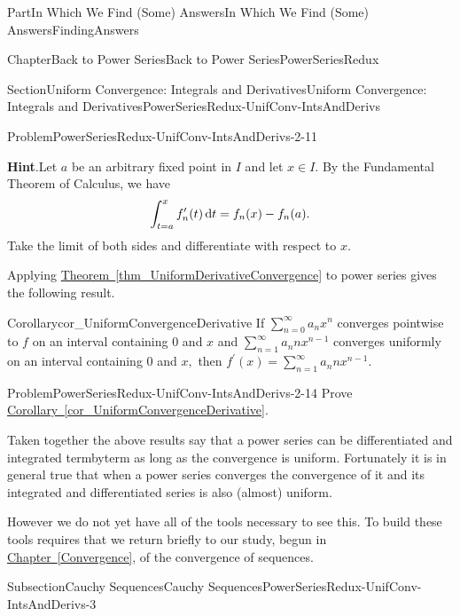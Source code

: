 \documentclass[oneside,10pt,]{book}
\newcommand{\blocktitlefont}{\relax}
\newcommand{\xreffont}{\relax}
\numberwithin{equation}{part}
\newcommand{\dx}[1]{\,{\rm d}#1}
\begin{document}
\begin{partptx}{Part}{In Which We Find (Some) Answers}{}{In Which We Find (Some) Answers}{}{}{FindingAnswers}
\begin{chapterptx}{Chapter}{Back to Power Series}{}{Back to Power Series}{}{}{PowerSeriesRedux}
\begin{sectionptx}{Section}{Uniform Convergence: Integrals and Derivatives}{}{Uniform Convergence: Integrals and Derivatives}{}{}{PowerSeriesRedux-UnifConv-IntsAndDerivs}
\begin{introduction}{}
\begin{problem}{Problem}{}{PowerSeriesRedux-UnifConv-IntsAndDerivs-2-11}
\par\smallskip%
\noindent\textbf{\blocktitlefont Hint}.\hypertarget{PowerSeriesRedux-UnifConv-IntsAndDerivs-2-11-4}{}\quad{}Let \(a\) be an arbitrary fixed point in \(I\) and let \(x\in I\).  By the Fundamental Theorem of Calculus, we have%
\begin{equation*}
\int_{t=a}^x f^\prime_n(t)\dx{t}=f_n(x)-f_n(a) \text{.}
\end{equation*}
Take the limit of both sides and differentiate with respect to \(x\).%
\end{problem}
Applying \hyperref[thm_UniformDerivativeConvergence]{Theorem~{\xreffont\ref{thm_UniformDerivativeConvergence}}}  to power series gives the following result.%
\begin{corollary}{Corollary}{}{}{cor_UniformConvergenceDerivative}%
If \(\sum_{n=0}^\infty a_nx^n\) converges pointwise to \(f\) on an interval containing \(0\) and \(x\) and \(\sum_{n=1}^\infty a_nnx^{n-1}\) converges uniformly on an interval containing \(0\) and \(x,\) then \(f^\prime(x)=\sum_{n=1}^\infty a_nnx^{n-1}\).%
\end{corollary}
\begin{problem}{Problem}{}{PowerSeriesRedux-UnifConv-IntsAndDerivs-2-14}%
Prove \hyperref[cor_UniformConvergenceDerivative]{Corollary~{\xreffont\ref{cor_UniformConvergenceDerivative}}}.%
\end{problem}
Taken together the above results say that a power series can be differentiated and integrated term\textendash{}by\textendash{}term as long as the convergence is uniform.  Fortunately it is in general true that when a power series converges the convergence of it and its integrated and differentiated series is also (almost) uniform.%
\par
However we do not yet have all of the tools necessary to see this.  To build these tools requires that we return briefly to our study, begun in \hyperref[Convergence]{Chapter~{\xreffont\ref{Convergence}}}, of the convergence of sequences.%
\end{introduction}%
%
%
\typeout{************************************************}
\typeout{************************************************}
%
\begin{subsectionptx}{Subsection}{Cauchy Sequences}{}{Cauchy Sequences}{}{}{PowerSeriesRedux-UnifConv-IntsAndDerivs-3}

\end{subsectionptx}
\end{sectionptx}
\end{chapterptx}
\end{partptx}
\end{document}
